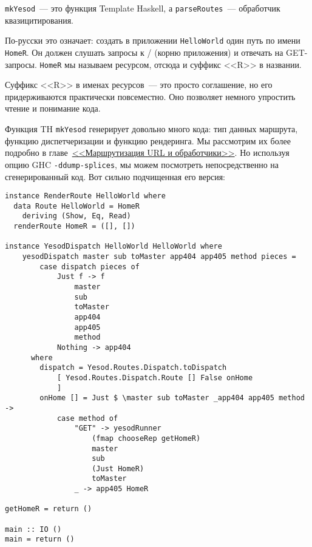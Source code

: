 \begin{remark}
  \lstinline!mkYesod!~--- это функция Template Haskell, а \lstinline!parseRoutes!~---
  обработчик квазицитирования.
\end{remark}

По-русски это означает: создать в приложении \texttt{HelloWorld} один путь по имени
\lstinline!HomeR!. Он должен слушать запросы к / (корню приложения) и отвечать на
GET-запросы. \lstinline!HomeR! мы называем ресурсом, отсюда и суффикс <<R>> в названии.

\begin{remark}
  Суффикс <<R>> в именах ресурсов~--- это просто соглашение, но его придерживаются
  практически повсеместно. Оно позволяет немного упростить чтение и понимание кода.
\end{remark}

Функция TH \lstinline!mkYesod! генерирует довольно много кода: тип данных маршрута,
функцию диспетчеризации и функцию рендеринга. Мы рассмотрим их более подробно в
главе~\hyperref[chap:routing]{<<Маршрутизация URL и обработчики>>}. Но используя опцию GHC
\lstinline'-ddump-splices', мы можем посмотреть непосредственно на сгенерированный
код. Вот сильно подчищенная его версия:

\begin{lstlisting}
instance RenderRoute HelloWorld where
  data Route HelloWorld = HomeR
    deriving (Show, Eq, Read)
  renderRoute HomeR = ([], [])

instance YesodDispatch HelloWorld HelloWorld where
    yesodDispatch master sub toMaster app404 app405 method pieces =
        case dispatch pieces of
            Just f -> f
                master
                sub
                toMaster
                app404
                app405
                method
            Nothing -> app404
      where
        dispatch = Yesod.Routes.Dispatch.toDispatch
            [ Yesod.Routes.Dispatch.Route [] False onHome
            ]
        onHome [] = Just $ \master sub toMaster _app404 app405 method ->
            case method of
                "GET" -> yesodRunner
                    (fmap chooseRep getHomeR)
                    master
                    sub
                    (Just HomeR)
                    toMaster
                _ -> app405 HomeR

getHomeR = return ()

main :: IO ()
main = return ()
\end{lstlisting}

